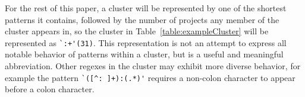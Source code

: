 For the rest of this paper, a cluster will be represented by one of the shortest patterns it contains, followed by the number of projects any member of the cluster appears in, so the cluster in Table~\ref{table:exampleCluster} will be represented as \verb!`:+'(31)!.  This representation is not an attempt to express all notable behavior of patterns within a cluster, but is a useful and meaningful abbreviation.
Other regexes in the cluster may exhibit more diverse behavior, for example the pattern \verb!`([^: ]+):(.*)'! requires a non-colon character to appear before a colon character.
